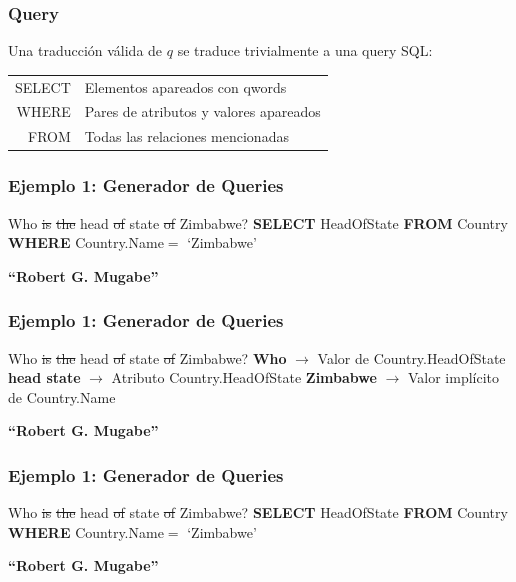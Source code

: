 \begin{frame}
\frametitle{Query}    
Una traducción válida de $q$ se traduce trivialmente a una query SQL:
\bigskip
\centering
\begin{tabular}{ r | l }
SELECT &  Elementos apareados con qwords \\
WHERE & Pares de atributos y valores apareados\\
FROM & Todas las relaciones mencionadas \\
\end{tabular}
\end{frame}

\begin{frame}[t]
\frametitle{Ejemplo 1: Generador de Queries}
\Large{{\color{blue}Who} \st{is} \st{the} {\color{blue}head} \st{of} {\color{blue}state} \st{of} {\color{purple}Zimbabwe}? 
\bigskip
\newline
{\color{white}\textbf{{\color{white}SELECT}} HeadOfState \newline
{\color{white}\textbf{FROM}} Country \newline
{\color{white}\textbf{WHERE}} Country.Name$=$ {\color{white}`Zimbabwe'}
}}

\bigskip

{\color{white}\textbf{``Robert G. Mugabe''}}

\end{frame}

\begin{frame}[t]
\frametitle{Ejemplo 1: Generador de Queries}
\Large{{\color{blue}Who} \st{is} \st{the} {\color{blue}head} \st{of} {\color{blue}state} \st{of} {\color{purple}Zimbabwe}? 
\bigskip
\newline
\textbf{{\color{blue}Who}} $\rightarrow$ Valor de Country.HeadOfState \newline
\textbf{{\color{blue}head state}} $\rightarrow$ Atributo Country.HeadOfState \newline
\textbf{{\color{purple}Zimbabwe}} $\rightarrow$ Valor implícito de Country.Name \newline
}

\bigskip

{\color{white}\textbf{``Robert G. Mugabe''}}

\end{frame}

\begin{frame}[t]
\frametitle{Ejemplo 1: Generador de Queries}
\Large{{\color{blue}Who} \st{is} \st{the} {\color{blue}head} \st{of} {\color{blue}state} \st{of} {\color{purple}Zimbabwe}? 
\bigskip
\newline
\textbf{{\color{purple}SELECT}} HeadOfState \newline
{\color{purple}\textbf{FROM}} Country \newline
{\color{purple}\textbf{WHERE}} Country.Name$=$ {\color{green}`Zimbabwe'}
}

\bigskip

\textbf{``Robert G. Mugabe''}

\end{frame}



